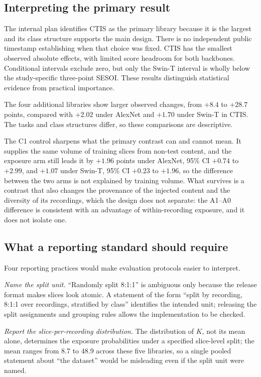 \subsection{Interpreting the primary result}

The internal plan identifies CTIS as the primary library because it is the largest and its class
structure supports the main design. There is no independent public timestamp establishing when
that choice was fixed. CTIS has the smallest observed absolute effects, with limited score
headroom for both backbones. Conditional intervals exclude zero, but only the Swin-T interval is
wholly below the study-specific three-point SESOI. These results distinguish statistical evidence
from practical importance.

The four additional libraries show larger observed changes, from $+8.4$ to $+28.7$ points,
compared with $+2.02$ under AlexNet and $+1.70$ under Swin-T in CTIS. The tasks and class structures
differ, so these comparisons are descriptive.

The C1 control sharpens what the primary contrast can and cannot mean. It supplies the same volume
of training slices from non-test content, and the exposure arm still leads it by $+1.96$ points
under AlexNet, 95\% CI $+0.74$ to $+2.99$, and $+1.07$ under Swin-T, 95\% CI $+0.23$ to
$+1.96$, so the
difference between the two arms is not explained by training volume. What survives is a contrast
that also changes the provenance of the injected content and the diversity of its recordings, which
the design does not separate: the A1--A0 difference is consistent with an advantage of
within-recording exposure, and it does not isolate one.

\subsection{What a reporting standard should require}

Four reporting practices would make evaluation protocols easier to interpret.

\emph{Name the split unit.} ``Randomly split 8:1:1'' is ambiguous only because the release format
makes slices look atomic. A statement of the form ``split by recording, 8:1:1 over recordings,
stratified by class'' identifies the intended unit; releasing the split assignments and grouping
rules allows the implementation to be checked.

\emph{Report the slice-per-recording distribution.} The distribution of $K$, not its mean alone,
determines the exposure probabilities under a specified slice-level split; the mean ranges from 8.7 to 48.9 across these
five libraries, so a single pooled statement about ``the dataset'' would be misleading even if
the split unit were named.

